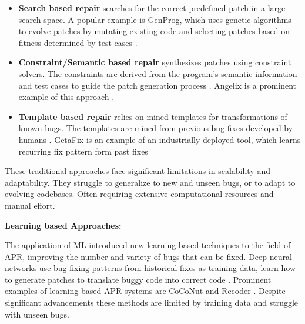 \begin{itemize}
    \item\textbf{Search based repair} searches for the correct predefined patch in a large search space. \cite{liuMarsCodeAgentAInative2024, huCanGPTO1Kill2024,zhangPATCHEmpoweringLarge2025} A popular example is GenProg, which uses genetic algorithms to evolve patches by mutating existing code and selecting patches based on fitness determined by test cases \cite{legouesGenProgGenericMethod2012}.

    \item\textbf{Constraint/Semantic based repair} synthesizes patches using constraint solvers. The constraints are derived from the program's semantic information and test cases to guide the patch generation process \cite{liuMarsCodeAgentAInative2024, mechtaevAngelixScalableMultiline2016}. Angelix is a prominent example of this approach \cite{mechtaevAngelixScalableMultiline2016}.

    \item\textbf{Template based repair} relies on mined templates for transformations of known bugs. \cite{xiaAutomatedProgramRepair2023} The templates are mined from previous bug fixes developed by humans \cite{xiaAutomatedProgramRepair2023, yinThinkRepairSelfDirectedAutomated2024}. GetaFix is an example of an industrially deployed tool, which learns recurring fix pattern form past fixes \cite{baderGetafixLearningFix2019}
\end{itemize}

These traditional approaches face significant limitations in scalability and adaptability. They struggle to generalize to new and unseen bugs, or to adapt to evolving codebases. Often requiring extensive computational resources and manual effort. \cite{puvvadiCodingAgentsComprehensive2025, xiaAutomatedProgramRepair2024}

\textbf{Learning based Approaches:}

The application of ML introduced new learning based techniques to the field of APR, improving the number and variety of bugs that can be fixed. Deep neural networks use bug fixing patterns from historical fixes as training data, learn how to generate patches to translate buggy code into correct code \cite{xiaAutomatedProgramRepair2023, tangLargeLanguageModels2024}. Prominent examples of  learning based APR systems are CoCoNut \cite{lutellierCoCoNuTCombiningContextaware2020} and Recoder \cite{zhuSyntaxguidedEditDecoder2021}. Despite significant advancements these methods are limited by training data and struggle with unseen bugs. \cite{xiaLessTrainingMore2022}

